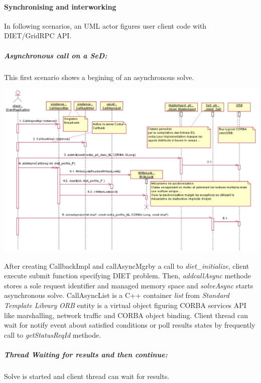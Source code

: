   \paragraph{Synchronising and interworking}
  In following scenarios, an UML actor figures user client code with DIET/GridRPC API. 

  \subparagraph{Asynchronous call on a SeD:} 
  This first scenario shows a begining of an asynchronous solve. 

  \hspace{-0.9 in}
  \includegraphics{./fig/CallAsyncSequenceDiagram.ps}

  After creating CallbackImpl and callAsyncMgrby a call to 
  \emph{diet\_initialize}, client execute submit function specifying DIET
  problem. Then, \emph{addcallAsync} methode stores a sole request 
  identifier and managed memory space and \emph{solveAsync} starts
  asynchronous solve.
  CallAsyncList is a C++ container \emph{list} from \emph{Standard Template Library}
  \emph{ORB} entity is a virtual object figuring CORBA services API like
  marshalling, network traffic and CORBA object binding.
  Client thread can wait for notify event about satisfied conditions or
  poll results states by frequently call to \emph{getStatusReqId} methode.

  \vspace{.9 in}

  \subparagraph{Thread Waiting for results and then continue:}
  Solve is started and client thread can wait for results.

